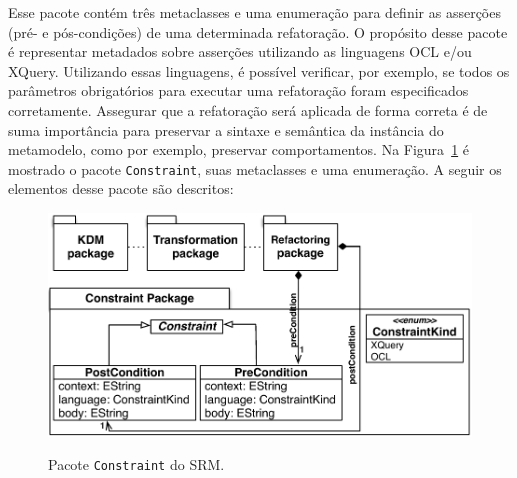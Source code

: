Esse pacote contém três metaclasses e uma enumeração para definir as asserções (pré- e pós-condições) de uma determinada refatoração. O propósito desse pacote é representar metadados sobre asserções utilizando as linguagens OCL e/ou XQuery. Utilizando essas linguagens, é possível verificar, por exemplo, se todos os parâmetros obrigatórios para executar uma refatoração foram especificados corretamente. Assegurar que a refatoração será aplicada de forma correta é de suma importância para preservar a sintaxe e semântica da instância do metamodelo, como por exemplo, preservar comportamentos. Na Figura~\ref{fig:pacote_constraint_srm} é mostrado o pacote \texttt{Constraint}, suas metaclasses e uma enumeração. A seguir os elementos desse pacote são descritos:

\begin{figure}[h]
	\centering
		\caption{Pacote \texttt{Constraint} do SRM.}
	\includegraphics[scale=0.70]{images/pacoteConstraint2}
	\label{fig:pacote_constraint_srm}
	\fautor
\end{figure}

